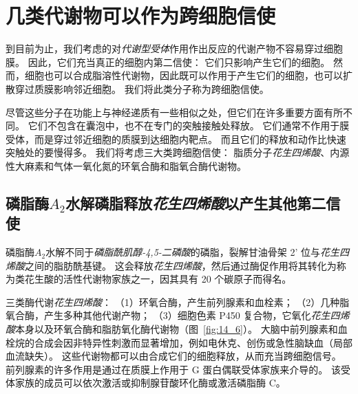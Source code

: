 \section{几类代谢物可以作为跨细胞信使}

到目前为止，我们考虑的对\textit{代谢型受体}作用作出反应的代谢产物不容易穿过细胞膜。
因此，它们充当真正的细胞内第二信使：
它们只影响产生它们的细胞。
然而，细胞也可以合成脂溶性代谢物，因此既可以作用于产生它们的细胞，也可以扩散穿过质膜影响邻近细胞。
我们将此类分子称为跨细胞信使。


尽管这些分子在功能上与神经递质有一些相似之处，但它们在许多重要方面有所不同。
它们不包含在囊泡中，也不在专门的突触接触处释放。
它们通常不作用于膜受体，而是穿过邻近细胞的质膜到达细胞内靶点。
而且它们的释放和动作比快速突触处的要慢得多。
我们将考虑三大类跨细胞信使：
脂质分子\textit{花生四烯酸}、内源性大麻素和气体一氧化氮的环氧合酶和脂氧合酶代谢物。



\subsection{磷脂酶$A_2$水解磷脂释放\textit{花生四烯酸}以产生其他第二信使}

磷脂酶$A_2$水解不同于\textit{磷脂酰肌醇-4,5-二磷酸}的磷脂，裂解甘油骨架 2' 位与\textit{花生四烯酸}之间的脂肪酰基键。
这会释放\textit{花生四烯酸}，然后通过酶促作用将其转化为称为类花生酸的活性代谢物家族之一，因其具有 20 个碳原子而得名。


三类酶代谢\textit{花生四烯酸}：
（1）环氧合酶，产生前列腺素和血栓素；
（2）几种脂氧合酶，产生多种其他代谢产物；
（3）细胞色素 P450 复合物，它氧化\textit{花生四烯酸}本身以及环氧合酶和脂肪氧化酶代谢物（图~\ref{fig:14_6}）。
大脑中前列腺素和血栓烷的合成会因非特异性刺激而显著增加，例如电休克、创伤或急性脑缺血（局部血流缺失）。
这些代谢物都可以由合成它们的细胞释放，从而充当跨细胞信号。
前列腺素的许多作用是通过在质膜上作用于 G 蛋白偶联受体家族来介导的。
该受体家族的成员可以依次激活或抑制腺苷酸环化酶或激活磷脂酶 C。


